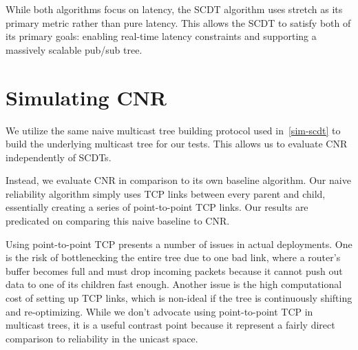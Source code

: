 While both algorithms focus on latency, the SCDT algorithm uses stretch as its primary metric rather than pure latency. This allows the SCDT to satisfy both of its primary goals: enabling real-time latency constraints and supporting a massively scalable pub/sub tree.

\section{Simulating CNR}
\label{sim-cnr}
We utilize the same naive multicast tree building protocol used in~\autoref{sim-scdt} to build the underlying multicast tree for our tests. This allows us to evaluate CNR independently of SCDTs.

Instead, we evaluate CNR in comparison to its own baseline algorithm. Our naive reliability algorithm simply uses TCP links between every parent and child, essentially creating a series of point-to-point TCP links. Our results are predicated on comparing this naive baseline to CNR. 

Using point-to-point TCP presents a number of issues in actual deployments. One is the risk of bottlenecking the entire tree due to one bad link, where a router's buffer becomes full and must drop incoming packets because it cannot push out data to one of its children fast enough. Another issue is the high computational cost of setting up TCP links, which is non-ideal if the tree is continuously shifting and re-optimizing. While we don't advocate using point-to-point TCP in multicast trees, it is a useful contrast point because it represent a fairly direct comparison to reliability in the unicast space.